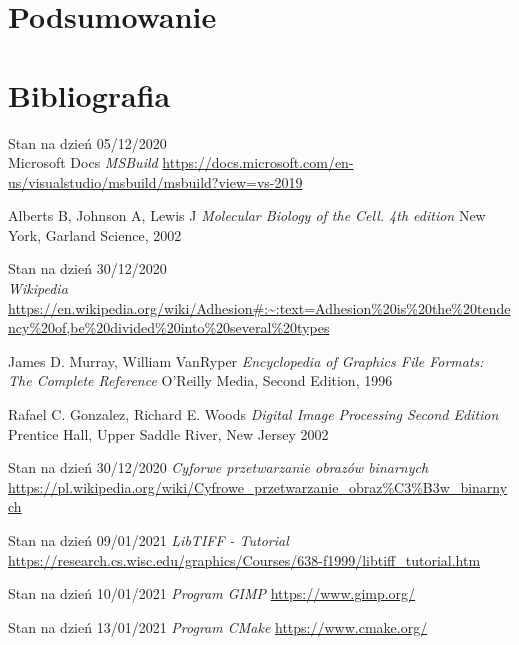 \documentclass{article}
\begin{document}
    \section{Podsumowanie}
    \newpage
    \section{Bibliografia}
    \begin{thebibliography}{9}

        Stan na dzień 05/12/2020\\
        Microsoft Docs
        \textit{MSBuild}
        \url{https://docs.microsoft.com/en-us/visualstudio/msbuild/msbuild?view=vs-2019}

        Alberts B, Johnson A, Lewis J
        \textit{Molecular Biology of the Cell. 4th edition}
        New York, Garland Science, 2002

        Stan na dzień 30/12/2020\\
        \textit{Wikipedia}
        \url{https://en.wikipedia.org/wiki/Adhesion#:~:text=Adhesion%20is%20the%20tendency%20of,be%20divided%20into%20several%20types}

        James D. Murray, William VanRyper
        \textit{Encyclopedia of Graphics File Formats: The Complete Reference}
        O'Reilly Media, Second Edition, 1996

        Rafael C. Gonzalez, Richard E. Woods
        \textit{Digital Image Processing Second Edition}
        Prentice Hall, Upper Saddle River, New Jersey 2002 

        Stan na dzień 30/12/2020 
        \textit{Cyforwe przetwarzanie obrazów binarnych}
        \url{https://pl.wikipedia.org/wiki/Cyfrowe_przetwarzanie_obraz%C3%B3w_binarnych}

        Stan na dzień 09/01/2021 
        \textit{LibTIFF - Tutorial}
        \url{https://research.cs.wisc.edu/graphics/Courses/638-f1999/libtiff_tutorial.htm}
    
        Stan na dzień 10/01/2021 
        \textit{Program GIMP}
        \url{https://www.gimp.org/}

        Stan na dzień 13/01/2021
        \textit{Program CMake}
        \url{https://www.cmake.org/}


\end{thebibliography}
\end{document}
